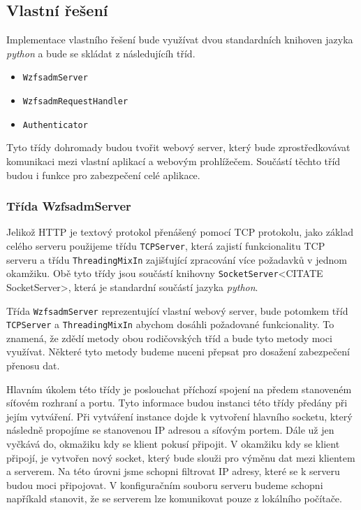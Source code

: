     \subsection{Vlastní řešení}
    Implementace vlastního řešení bude využívat dvou standardních knihoven jazyka \emph{python} a bude se skládat z následujícíh tříd.
    \begin{itemize}
      \item \verb|WzfsadmServer|
      \item \verb|WzfsadmRequestHandler|
      \item \verb|Authenticator|
    \end{itemize}
    
    Tyto třídy dohromady budou tvořit webový server, který bude zprostředkovávat komunikaci mezi vlastní aplikací a webovým prohlížečem. Součástí těchto tříd budou i funkce pro zabezpečení celé aplikace.
    \subsubsection{Třída WzfsadmServer}
    Jelikož HTTP je textový protokol přenášený pomocí TCP protokolu, jako základ celého serveru použijeme třídu \verb|TCPServer|, která zajistí funkcionalitu TCP serveru a třídu \verb|ThreadingMixIn| zajišťující zpracování více požadavků v jednom okamžiku. Obě tyto třídy jsou součástí knihovny \verb|SocketServer|<CITATE SocketServer>, která je standardní součástí jazyka \emph{python}.
    
    Třída \verb|WzfsadmServer| reprezentující vlastní webový server, bude potomkem tříd \verb|TCPServer| a \verb|ThreadingMixIn| abychom dosáhli požadované funkcionality. To znamená, že zdědí metody obou rodičovských tříd a bude tyto metody moci využívat. Některé tyto metody budeme nuceni přepsat pro dosažení zabezpečení přenosu dat.
    
    Hlavním úkolem této třídy je poslouchat příchozí spojení na předem stanoveném síťovém rozhraní a portu. Tyto informace budou instanci této třídy předány při jejím vytváření. Při vytváření instance dojde k vytvoření hlavního socketu, který následně propojíme se stanovenou IP adresou a síťovým portem. Dále už jen vyčkává do, okmažiku kdy se klient pokusí připojit. V okamžiku kdy se klient připojí, je vytvořen nový socket, který bude slouži pro výměnu dat mezi klientem a serverem. Na této úrovni jsme schopni filtrovat IP adresy, které se k serveru budou moci připojovat. V konfiguračním souboru serveru budeme schopni napříkald stanovit, že se serverem lze komunikovat pouze z lokálního počítače.
    
